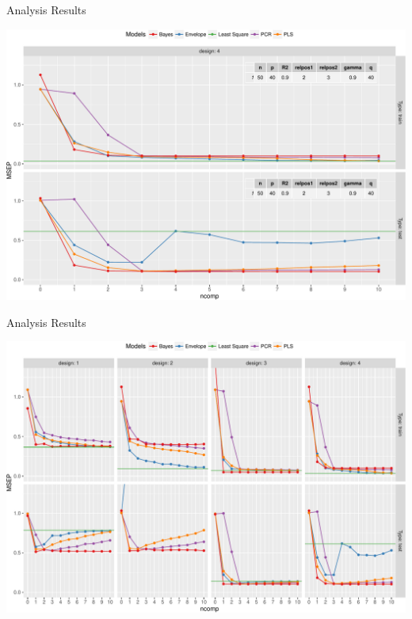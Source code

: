 \documentclass[ignorenonframetext,]{beamer}
\begin{document}
\begin{frame}{Analysis Results}

\includegraphics{Main_files/figure-beamer/unnamed-chunk-9-1.pdf}

\end{frame}

\begin{frame}{Analysis Results}

\includegraphics{Main_files/figure-beamer/unnamed-chunk-10-1.pdf}

\end{frame}
\end{document}
